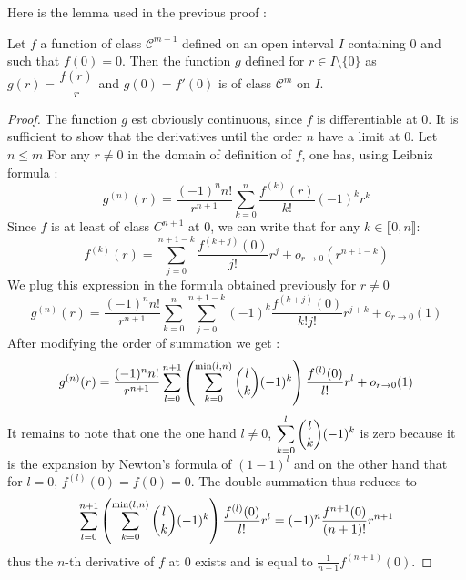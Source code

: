 \documentclass[11pt,a4paper]{article}
\begin{document}
Here is the lemma used in the previous proof :
\begin{Lem} Let $f$ a function of class $\mathcal{C}^{m+1}$ defined on an open interval $I$ containing $0$ and such that $f(0) = 0$. Then the function $g$ defined for  $r\in I\setminus{\{0\}}$ as $g(r) = \dfrac{f(r)}{r}$ and $g(0) = f'(0)$ is of class $\mathcal{C}^m$ on $I$. 
\begin{proof} The function $g$ est obviously continuous, since $f$ is differentiable at $0$. It is sufficient to show that the derivatives until the order $n$ have a limit at $0$. Let $n\leq m$
For any $r \neq 0$ in the domain of definition of $f$, one has, using Leibniz formula :
\[ g^{(n)}(r) = \dfrac{(-1)^n n!}{r^{n+1}}\sum_{k=0}^{n}\dfrac{f^{(k)}(r)}{k!}(-1)^k r^k\]
Since $f$ is at least of class $C^{n+1}$ at $0$, we can write that for any $k \in  \llbracket0,n \rrbracket$: \[f^{(k)}(r) = \sum_{j=0}^{n+1-k} \dfrac{f^{(k+j)}(0)}{j!}r^j + o_{r\to0}(r^{n+1-k})\] We plug this expression in the formula obtained previously for $r\neq 0$ 
\[ g^{(n)}(r) = \dfrac{(-1)^n n!}{r^{n+1}}\sum_{k=0}^{n}\sum_{j=0}^{n+1-k} (-1)^k \dfrac{f^{(k+j)}(0)}{k!j!}r^{j+k} + o_{r\to0}(1)\]
After modifying the order of summation we get :
\[ g^{(n)}(r) = \dfrac{(-1)^n n!}{r^{n+1}}\sum_{l=0}^{n+1}\left(\sum_{k=0}^{\min(l,n)} \dbinom{l}{k} (-1)^k\right)\dfrac{f^{(l)}(0)}{l!}r^{l}   + o_{r\to0}(1)\]
It remains to note that one the one hand $l\neq 0$, $\displaystyle\sum_{k=0}^l \dbinom{l}{k} (-1)^k$ is zero because it is the expansion by Newton's formula of  $(1-1)^l$ and on the other hand that for $l=0$, $f^{(l)}(0) = f(0) = 0$. The double summation thus reduces to
\[\sum_{l=0}^{n+1}\left(\sum_{k=0}^{\min(l,n)} \dbinom{l}{k} (-1)^k\right)\dfrac{f^{(l)}(0)}{l!}r^{l} = (-1)^{n} \dfrac{f^{n+1}(0)}{(n+1)!}r^{n+1}\]
thus the $n$-th derivative of $f$ at $0$ exists and is equal to  $\frac{1}{n+1}f^{(n+1)}(0)$. 
\end{proof}
\label{lemmefrsurr}
\end{Lem}
\end{document}

